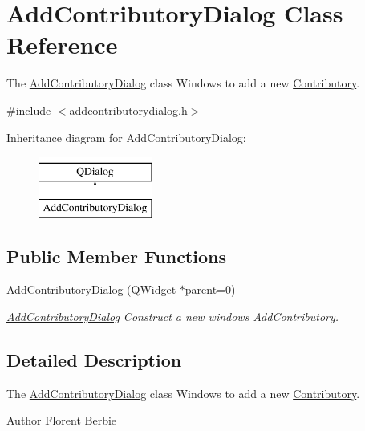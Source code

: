 \hypertarget{classAddContributoryDialog}{\section{Add\-Contributory\-Dialog Class Reference}
\label{classAddContributoryDialog}
}


The \hyperlink{classAddContributoryDialog}{Add\-Contributory\-Dialog} class Windows to add a new \hyperlink{classContributory}{Contributory}.  




{\ttfamily \#include $<$addcontributorydialog.\-h$>$}

Inheritance diagram for Add\-Contributory\-Dialog\-:\begin{figure}[H]
\begin{center}
\leavevmode
\includegraphics[height=2.000000cm]{d9/dfa/classAddContributoryDialog}
\end{center}
\end{figure}
\subsection*{Public Member Functions}
\begin{DoxyCompactItemize}
\item 
\hyperlink{classAddContributoryDialog_a75ef0d55afcf2cc30a702bb4792ccc2b}{Add\-Contributory\-Dialog} (Q\-Widget $\ast$parent=0)
\begin{DoxyCompactList}\small\item\em \hyperlink{classAddContributoryDialog}{Add\-Contributory\-Dialog} Construct a new windows Add\-Contributory. \end{DoxyCompactList}\end{DoxyCompactItemize}


\subsection{Detailed Description}
The \hyperlink{classAddContributoryDialog}{Add\-Contributory\-Dialog} class Windows to add a new \hyperlink{classContributory}{Contributory}. 

\begin{DoxyAuthor}{Author}
Florent Berbie 
\end{DoxyAuthor}


